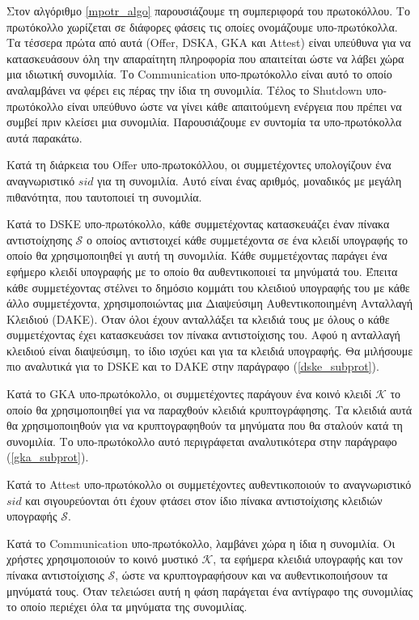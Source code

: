 Στον αλγόριθμο \ref{mpotr_algo} παρουσιάζουμε τη συμπεριφορά του πρωτοκόλλου.
Το πρωτόκολλο χωρίζεται σε διάφορες φάσεις τις οποίες ονομάζουμε υπο-πρωτόκολλα.
Τα τέσσερα πρώτα από αυτά (Offer, DSKA, GKA και Attest) είναι υπεύθυνα για να κατασκευάσουν όλη την απαραίτητη πληροφορία που απαιτείται ώστε να λάβει χώρα μια ιδιωτική συνομιλία.
Το Communication υπο-πρωτόκολλο είναι αυτό το οποίο αναλαμβάνει να φέρει εις πέρας την ίδια τη συνομιλία.
Τέλος το Shutdown υπο-πρωτόκολλο είναι υπεύθυνο ώστε να γίνει κάθε απαιτούμενη ενέργεια που πρέπει να συμβεί πριν κλείσει μια συνομιλία.
Παρουσιάζουμε εν συντομία τα υπο-πρωτόκολλα αυτά παρακάτω.

Κατά τη διάρκεια του Offer υπο-πρωτοκόλλου, οι συμμετέχοντες υπολογίζουν ένα αναγνωριστικό $sid$ για τη συνομιλία.
Αυτό είναι ένας αριθμός, μοναδικός με μεγάλη πιθανότητα, που ταυτοποιεί τη συνομιλία.

Κατά το DSKE υπο-πρωτόκολλο, κάθε συμμετέχοντας κατασκευάζει έναν πίνακα αντιστοίχησης $\mathcal{S}$ ο οποίος αντιστοιχεί κάθε συμμετέχοντα σε ένα κλειδί υπογραφής το οποίο θα χρησιμοποιηθεί γι αυτή τη συνομιλία.
Κάθε συμμετέχοντας παράγει ένα εφήμερο κλειδί υπογραφής με το οποίο θα αυθεντικοποιεί τα μηνύματά του.
Έπειτα κάθε συμμετέχοντας στέλνει το δημόσιο κομμάτι του κλειδιού υπογραφής του με κάθε άλλο συμμετέχοντα, χρησιμοποιώντας μια Διαψεύσιμη Αυθεντικοποιημένη Ανταλλαγή Κλειδιού (DAKE).
Όταν όλοι έχουν ανταλλάξει τα κλειδιά τους με όλους ο κάθε συμμετέχοντας έχει κατασκευάσει τον πίνακα αντιστοίχισης του.
Αφού η ανταλλαγή κλειδιού είναι διαψεύσιμη, το ίδιο ισχύει και για τα κλειδιά υπογραφής.
Θα μιλήσουμε πιο αναλυτικά για το DSKE και το DAKE στην παράγραφο (\ref{dske_subprot}).

Κατά το GKA υπο-πρωτόκολλο, οι συμμετέχοντες παράγουν ένα κοινό κλειδί $\mathcal{K}$ το οποίο θα χρησιμοποιηθεί για να παραχθούν κλειδιά κρυπτογράφησης.
Τα κλειδιά αυτά θα χρησιμοποιηθούν για να κρυπτογραφηθούν τα μηνύματα που θα σταλούν κατά τη συνομιλία.
Το υπο-πρωτόκολλο αυτό περιγράφεται αναλυτικότερα στην παράγραφο (\ref{gka_subprot}).

Κατά το Attest υπο-πρωτόκολλο οι συμμετέχοντες αυθεντικοποιούν το αναγνωριστικό $sid$ και σιγουρεύονται ότι έχουν φτάσει στον ίδιο πίνακα αντιστοίχισης κλειδιών υπογραφής $\mathcal{S}$.

Κατά το Communication υπο-πρωτόκολλο, λαμβάνει χώρα η ίδια η συνομιλία.
Οι χρήστες χρησιμοποιούν το κοινό μυστικό $\mathcal{K}$, τα εφήμερα κλειδιά υπογραφής και τον πίνακα αντιστοίχισης $\mathcal{S}$, ώστε να κρυπτογραφήσουν και να αυθεντικοποιήσουν τα μηνύματά τους.
Όταν τελειώσει αυτή η φάση παράγεται ένα αντίγραφο της συνομιλίας το οποίο περιέχει όλα τα μηνύματα της συνομιλίας.

